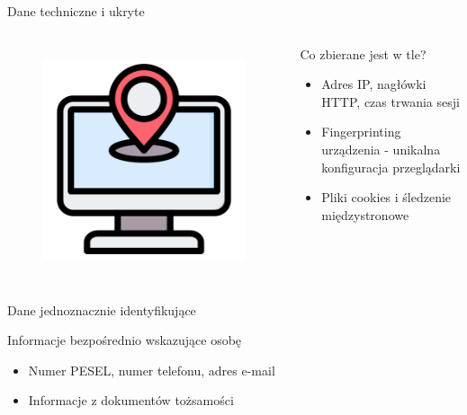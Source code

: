   
  \begin{frame}{Dane techniczne i ukryte}
  \begin{columns}[c]
      \begin{figure}
        \centering
        \includegraphics[height=0.45\textheight]{images/ip-address.png}
        \label{fig:ipTracking}
      \end{figure}
      \begin{alertblock}{Co zbierane jest w tle?}
        \begin{itemize}
          \item Adres IP, nagłówki HTTP, czas trwania sesji
          \item Fingerprinting urządzenia - unikalna konfiguracja przeglądarki
          \item Pliki cookies i śledzenie międzystronowe
        \end{itemize}
      \end{alertblock}
  \end{columns}
  \end{frame}
  
  
  \begin{frame}{Dane jednoznacznie identyfikujące}
    \begin{alertblock}{Informacje bezpośrednio wskazujące osobę}
      \begin{itemize}
        \item Numer PESEL, numer telefonu, adres e-mail
        \item Informacje z dokumentów tożsamości \cite{LEXDIGITAL_CZY_IMIE_NAZW_TO_DANE_OS}
      \end{itemize}
    \end{alertblock}
  \end{frame}
  

